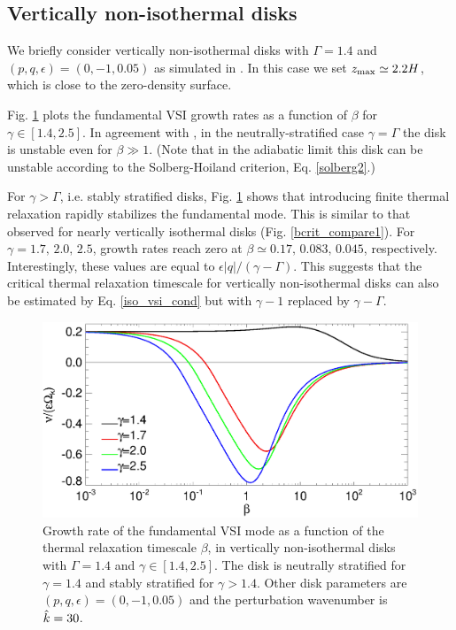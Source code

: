 \subsection{Vertically non-isothermal disks} 
We briefly consider vertically non-isothermal disks with 
$\Gamma=1.4$ and $(p,q,\epsilon)=(0,-1,0.05)$ as simulated in
\cite{nelson13}. In this case we set $z_\mathrm{max}\simeq2.2H$, which
is close to the zero-density surface.      

Fig. \ref{gcorr_compare_vnoniso} plots the fundamental VSI growth
rates as a function of $\beta$ for $\gamma\in[1.4,2.5]$. In agreement with \citeauthor{nelson13}, in 
the neutrally-stratified case $\gamma=\Gamma$ the disk is unstable 
even for $\beta\gg 1$. (Note that in the adiabatic limit 
this disk can be unstable according to the
Solberg-Hoiland criterion, Eq. \ref{solberg2}.) 

For $\gamma>\Gamma$, i.e. stably stratified disks,
Fig. \ref{gcorr_compare_vnoniso} shows that introducing finite thermal
relaxation rapidly stabilizes the fundamental mode. This is
similar to that observed for nearly vertically isothermal disks
(Fig. \ref{bcrit_compare1}). For $\gamma=1.7,\,2.0,\,2.5$, growth
rates reach zero at  $\beta\simeq0.17,\,0.083,\,0.045$, respectively.
Interestingly, these values are equal to
$\epsilon|q|/(\gamma-\Gamma)$. This suggests that the critical thermal
relaxation timescale for vertically non-isothermal disks can also be
estimated by Eq. \ref{iso_vsi_cond} but with $\gamma-1$ replaced by
$\gamma-\Gamma$. 

\begin{figure}
  \includegraphics[width=\linewidth,clip=true,trim=0cm 0cm 0cm
  0cm]{figures/gcorr_compare_vnoniso2}
  \caption{Growth rate of the fundamental VSI mode as a function of
    the thermal relaxation timescale $\beta$, in vertically
    non-isothermal disks with $\Gamma=1.4$ and
    $\gamma\in[1.4,2.5]$. The disk is neutrally
    stratified for $\gamma=1.4$ and stably stratified for
    $\gamma>1.4$. Other disk parameters are
    $(p,q,\epsilon)=(0,-1,0.05)$ and the perturbation wavenumber is
    $\hat{k}=30$.  
    \label{gcorr_compare_vnoniso}}
\end{figure}












